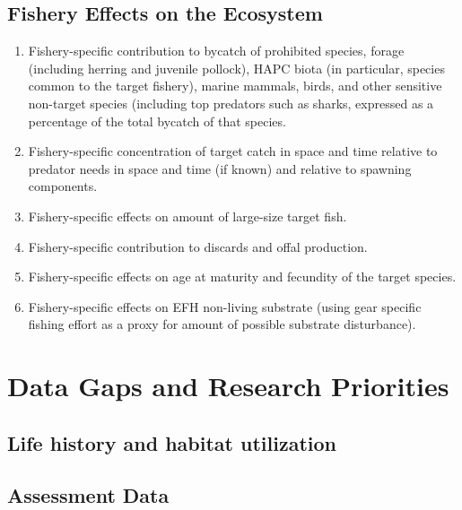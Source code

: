 \documentclass[
  11pt,
]{article}
\providecommand{\tightlist}{%
  \setlength{\itemsep}{0pt}\setlength{\parskip}{0pt}}
\begin{document}
\hypertarget{fishery-effects-on-the-ecosystem}{%
\subsection{Fishery Effects on the Ecosystem}\label{fishery-effects-on-the-ecosystem}}

\begin{enumerate}
\def\labelenumi{\arabic{enumi}.}
\tightlist
\item
  Fishery-specific contribution to bycatch of prohibited species, forage (including herring and juvenile pollock), HAPC biota (in particular, species common to the target fishery), marine mammals, birds, and other sensitive non-target species (including top predators such as sharks, expressed as a percentage of the total bycatch of that species.
\item
  Fishery-specific concentration of target catch in space and time relative to predator needs in space and time (if known) and relative to spawning components.
\item
  Fishery-specific effects on amount of large-size target fish.
\item
  Fishery-specific contribution to discards and offal production.
\item
  Fishery-specific effects on age at maturity and fecundity of the target species.
\item
  Fishery-specific effects on EFH non-living substrate (using gear specific fishing effort as a proxy for amount of possible substrate disturbance).
\end{enumerate}

\hypertarget{data-gaps-and-research-priorities}{%
\section{Data Gaps and Research Priorities}\label{data-gaps-and-research-priorities}}

\hypertarget{life-history-and-habitat-utilization}{%
\subsection{Life history and habitat utilization}\label{life-history-and-habitat-utilization}}

\hypertarget{assessment-data}{%
\subsection{Assessment Data}\label{assessment-data}}
\end{document}

